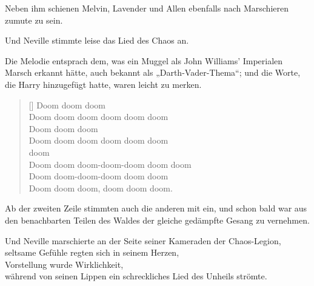 Neben ihm schienen Melvin, Lavender und Allen ebenfalls nach Marschieren zumute zu sein.

Und Neville stimmte leise das Lied des Chaos an.

Die Melodie entsprach dem, was ein Muggel als John Williams’ Imperialen Marsch erkannt hätte, auch bekannt als „Darth-Vader-Thema“; und die Worte, die Harry hinzugefügt hatte, waren leicht zu merken.

\baselineskip\settowidth{\versewidth}{Doom doom doom-doom-doom doom doom}
\begin{verse}[\versewidth]
Doom doom doom\\
Doom doom doom doom doom doom\\
Doom doom doom\\
Doom doom doom doom doom doom\\
 doom \\
Doom doom doom-doom-doom doom doom\\
Doom doom-doom-doom doom doom\\
Doom doom doom, doom doom doom.
\end{verse}\baselineskip

Ab der zweiten Zeile stimmten auch die anderen mit ein, und schon bald war aus den benachbarten Teilen des Waldes der gleiche gedämpfte Gesang zu vernehmen.

Und Neville marschierte an der Seite seiner Kameraden der Chaos-Legion,\\
seltsame Gefühle regten sich in seinem Herzen,\\
Vorstellung wurde Wirklichkeit,\\
während von seinen Lippen ein schreckliches Lied des Unheils strömte.

